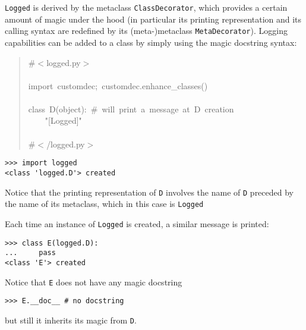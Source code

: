 \documentclass[11pt,english]{article}
\begin{document}
\texttt{Logged} is derived by the metaclass \texttt{ClassDecorator}, 
which provides a certain amount of magic under the hood (in particular
its printing representation and its calling syntax are redefined by its
(meta-)metaclass \texttt{MetaDecorator}). 
Logging capabilities can be added to a class 
by simply using the magic docstring syntax:
\begin{quote}
\begin{ttfamily}\begin{flushleft}
\mbox{{\#}{$<$}logged.py{$>$}}\\
\mbox{}\\
\mbox{import~customdec;~customdec.enhance{\_}classes()}\\
\mbox{}\\
\mbox{class~D(object):~{\#}~will~print~a~message~at~D~creation}\\
\mbox{~~~~"[Logged]"}\\
\mbox{}\\
\mbox{{\#}{$<$}/logged.py{$>$}}
\end{flushleft}\end{ttfamily}
\end{quote}
\begin{verbatim}>>> import logged
<class 'logged.D'> created\end{verbatim}

Notice that the printing representation of \texttt{D} involves the name
of \texttt{D} preceded by the name of its metaclass, which in this case
is \texttt{Logged}

Each time an instance of \texttt{Logged} is created, a similar message is printed:
\begin{verbatim}>>> class E(logged.D):
...     pass
<class 'E'> created\end{verbatim}

Notice that \texttt{E} does not have any magic docstring
\begin{verbatim}>>> E.__doc__ # no docstring\end{verbatim}

but still it inherits its magic from \texttt{D}.
\end{document}
